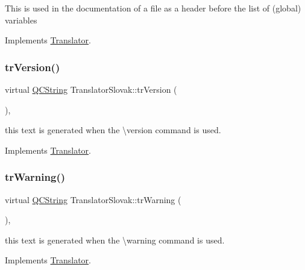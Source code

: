 This is used in the documentation of a file as a header before the list of (global) variables 

Implements \mbox{\hyperlink{class_translator}{Translator}}.

\mbox{\label{class_translator_slovak_a8ed0837135e75c1cfdd719e8468d10ec}} 
\subsubsection{\texorpdfstring{trVersion()}{trVersion()}}
{\footnotesize\ttfamily virtual \mbox{\hyperlink{class_q_c_string}{Q\+C\+String}} Translator\+Slovak\+::tr\+Version (\begin{DoxyParamCaption}{ }\end{DoxyParamCaption})\hspace{0.3cm}{\ttfamily [inline]}, {\ttfamily [virtual]}}

this text is generated when the \textbackslash{}version command is used. 

Implements \mbox{\hyperlink{class_translator}{Translator}}.

\mbox{\label{class_translator_slovak_a114912c2d446908e484d6b2e4ab90afd}} 
\subsubsection{\texorpdfstring{trWarning()}{trWarning()}}
{\footnotesize\ttfamily virtual \mbox{\hyperlink{class_q_c_string}{Q\+C\+String}} Translator\+Slovak\+::tr\+Warning (\begin{DoxyParamCaption}{ }\end{DoxyParamCaption})\hspace{0.3cm}{\ttfamily [inline]}, {\ttfamily [virtual]}}

this text is generated when the \textbackslash{}warning command is used. 

Implements \mbox{\hyperlink{class_translator}{Translator}}.

\mbox{\label{class_translator_slovak_a906ebc4ac3ebd81b3c6087eb260b9bac}} 
